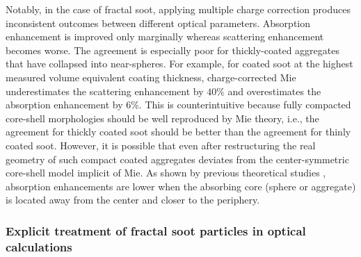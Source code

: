 Notably, in the case of fractal soot, applying multiple charge correction produces inconsistent outcomes between different optical parameters. Absorption enhancement is improved only marginally whereas scattering enhancement becomes worse. The agreement is especially poor for thickly-coated aggregates that have collapsed into near-spheres. For example, for coated soot at the highest measured volume equivalent coating thickness, charge-corrected Mie underestimates the scattering enhancement by $40\%$ and overestimates the absorption enhancement by $6\%$. This is counterintuitive because fully compacted core-shell morphologies should be well reproduced by Mie theory, i.e., the agreement for thickly coated soot should be better than the agreement for thinly coated soot. However, it is possible that even after restructuring the real geometry of such compact coated aggregates deviates from the center-symmetric core-shell model implicit of Mie. As shown by previous theoretical studies \citep{RN71,RN72}, absorption enhancements are lower when the absorbing core (sphere or aggregate) is located away from the center and closer to the periphery.

\subsubsection{Explicit treatment of fractal soot particles in optical calculations}



